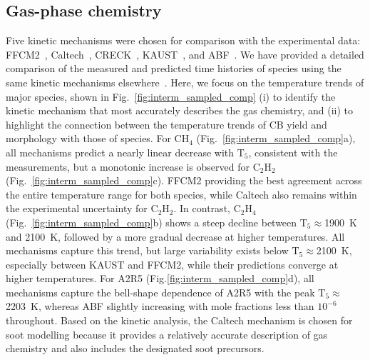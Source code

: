 \subsection{Gas-phase chemistry}

Five kinetic mechanisms were chosen for comparison with the experimental data: FFCM2~\citep{ZDV2023}, Caltech~\citep{blanquart2009chemical}, CRECK~\citep{saggese2015kinetic}, KAUST~\citep{wang2013pah}, and ABF~\citep{appel2000kinetic}. We have provided a detailed comparison of the measured and predicted time histories of species using the same kinetic mechanisms elsewhere~\citep{clark2025}. Here, we focus on the temperature trends of major species, shown in Fig.~\ref{fig:interm_sampled_comp} (i) to identify the kinetic mechanism that most accurately describes the gas chemistry, and (ii) to highlight the connection between the temperature trends of CB yield and morphology with those of species. For $\mathrm{CH_4}$ (Fig.~\ref{fig:interm_sampled_comp}a), all mechanisms predict a nearly linear decrease with $\mathrm{T_5}$, consistent with the measurements, but a monotonic increase is observed for $\mathrm{C_2H_2}$ (Fig.~\ref{fig:interm_sampled_comp}c). FFCM2 providing the best agreement across the entire temperature range for both species, while Caltech also remains within the experimental uncertainty for $\mathrm{C_2H_2}$. In contrast, $\mathrm{C_2H_4}$ (Fig.~\ref{fig:interm_sampled_comp}b) shows a steep decline between $\mathrm{T_5}$$\approx$1900~K and 2100~K, followed by a more gradual decrease at higher temperatures. All mechanisms capture this trend, but large variability exists below $\mathrm{T_5}$$\approx$2100~K, especially between KAUST and FFCM2, while their predictions converge at higher temperatures. For A2R5 (Fig.\ref{fig:interm_sampled_comp}d), all mechanisms capture the bell-shape dependence of A2R5 with the peak $\mathrm{T_5}$$\approx$2203~K, whereas ABF slightly increasing with mole fractions less than $10^{-6}$ throughout. Based on the kinetic analysis, the Caltech mechanism is chosen for soot modelling because it provides a relatively accurate description of gas chemistry and also includes the designated soot precursors.
$$

